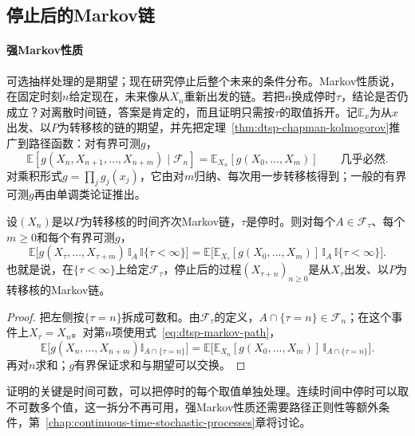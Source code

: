 \subsection{停止后的Markov链}
\label{sec:dtsp-strong-markov}

\paragraph{强Markov性质}
可选抽样处理的是期望；现在研究停止后整个未来的条件分布。Markov性质说，在固定时刻$n$给定现在，未来像从$X_n$重新出发的链。若把$n$换成停时$\tau$，结论是否仍成立？对离散时间链，答案是肯定的，而且证明只需按$\tau$的取值拆开。记$\mathbb E_x$为从$x$出发、以$P$为转移核的链的期望，并先把定理~\ref{thm:dtsp-chapman-kolmogorov}推广到路径函数：对有界可测$g$，
\begin{equation}
  \mathbb E[g(X_n,X_{n+1},\ldots,X_{n+m})\mid\mathcal F_n]=\mathbb E_{X_n}[g(X_0,\ldots,X_m)]\qquad\text{几乎必然}.
  \label{eq:dtsp-markov-path}
\end{equation}
对乘积形式$g=\prod_jg_j(x_j)$，它由对$m$归纳、每次用一步转移核得到；一般的有界可测$g$再由单调类论证推出。

\begin{theorem}[离散时间的强Markov性质]
  \label{thm:dtsp-strong-markov}
  设$(X_n)$是以$P$为转移核的时间齐次Markov链，$\tau$是停时。则对每个$A\in\mathcal F_\tau$、每个$m\geq0$和每个有界可测$g$，
  \[
    \mathbb E\bigl[g(X_\tau,\ldots,X_{\tau+m})\,\mathbb I_A\,\mathbb I\{\tau<\infty\}\bigr]
    =\mathbb E\bigl[\mathbb E_{X_\tau}[g(X_0,\ldots,X_m)]\,\mathbb I_A\,\mathbb I\{\tau<\infty\}\bigr].
  \]
  也就是说，在$\{\tau<\infty\}$上给定$\mathcal F_\tau$，停止后的过程$(X_{\tau+n})_{n\geq0}$是从$X_\tau$出发、以$P$为转移核的Markov链。
\end{theorem}

\begin{proof}
把左侧按$\{\tau=n\}$拆成可数和。由$\mathcal F_\tau$的定义，$A\cap\{\tau=n\}\in\mathcal F_n$；在这个事件上$X_\tau=X_n$。对第$n$项使用式~\eqref{eq:dtsp-markov-path}，
\[
  \mathbb E\bigl[g(X_n,\ldots,X_{n+m})\mathbb I_{A\cap\{\tau=n\}}\bigr]
  =\mathbb E\bigl[\mathbb E_{X_n}[g(X_0,\ldots,X_m)]\,\mathbb I_{A\cap\{\tau=n\}}\bigr].
\]
再对$n$求和；$g$有界保证求和与期望可以交换。
\end{proof}

证明的关键是时间可数，可以把停时的每个取值单独处理。连续时间中停时可以取不可数多个值，这一拆分不再可用，强Markov性质还需要路径正则性等额外条件，第~\ref{chap:continuous-time-stochastic-processes}章将讨论。

